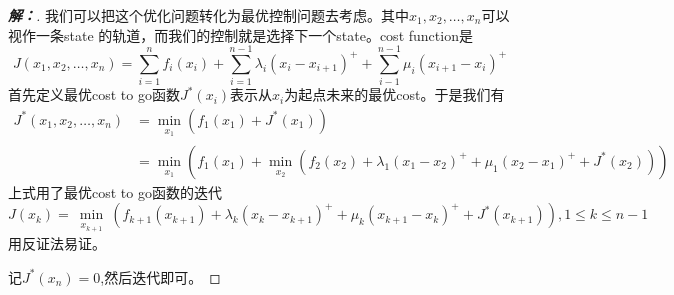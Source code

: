 \documentclass{article}
\newenvironment{solution}{\begin{proof}[\indent\bf 解：]}{\end{proof}}
\theoremstyle{remark}
\begin{document}
\begin{solution}
    我们可以把这个优化问题转化为最优控制问题去考虑。其中$x_1,x_2,\ldots,x_n$可以视作一条state
    的轨道，而我们的控制就是选择下一个state。cost function是\[J(x_1,x_2,\ldots,x_n) = \sum_{i=1}^n f_i(x_i) +
    \sum_{i=1}^{n-1} \lambda_i(x_i-x_{i+1})^{+} +
    \sum_{i-1}^{n-1} \mu_i(x_{i+1}-x_i)^{+}\]
    首先定义最优cost to go函数$J^*(x_i)$表示从$x_i$为起点未来的最优cost。于是我们有\[
    \begin{align}
        J^*(x_1,x_2,\ldots,x_n) &= \min_{\substack{x_1}}\left(f_1(x_1)+J^*(x_1)\right) \\
        &= \min_{\substack{x_1}}\left(f_1(x_1)+\min_{\substack{x_2}}\left(f_2(x_2)+\lambda_1(x_1-x_2)^{+}+ \mu_1(x_2-x_1)^{+}+J^*(x_2)\right)\right)
    \end{align}\]
上式用了最优cost to go函数的迭代\[J(x_k) = \min_{\substack{x_{k+1}}}\left(f_{k+1}(x_{k+1}) +
 \lambda_k(x_k-x_{k+1})^{+} + \mu_k(x_{k+1}-x_k)^{+} + J^*\left( x_{k+1} \right)\right),1 \leq k \leq n-1 \]用反证法易证。


 记$J^*(x_n)=0$,然后迭代即可。
\end{solution}
\end{document}

